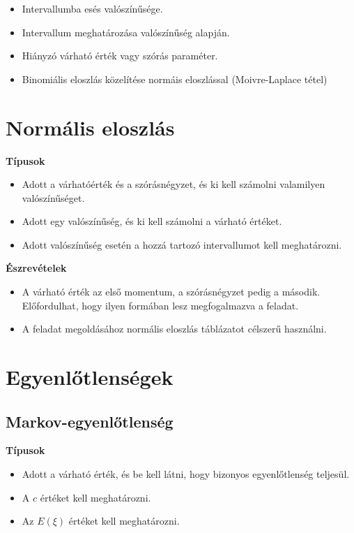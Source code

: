 \documentclass[a4paper]{article}
\begin{document}
\begin{itemize}
\item Intervallumba esés valószínűsége.
\item Intervallum meghatározása valószínűség alapján.
\item Hiányzó várható érték vagy szórás paraméter.
\item Binomiális eloszlás közelítése normáis eloszlással (Moivre-Laplace tétel)
\end{itemize}

\section{Normális eloszlás}

\noindent \textbf{Típusok}

\begin{itemize}
\item Adott a várhatóérték és a szórásnégyzet, és ki kell számolni valamilyen valószínűséget.
\item Adott egy valószínűség, és ki kell számolni a várható értéket.
\item Adott valószínűség esetén a hozzá tartozó intervallumot kell meghatározni.
\end{itemize}

\noindent \textbf{Észrevételek}

\begin{itemize}
\item A várható érték az első momentum, a szórásnégyzet pedig a második. Előfordulhat, hogy ilyen formában lesz megfogalmazva a feladat.
\item A feladat megoldásához normális eloszlás táblázatot célszerű használni.
\end{itemize}

\section{Egyenlőtlenségek}

\subsection{Markov-egyenlőtlenség}

\noindent \textbf{Típusok}

\begin{itemize}
\item Adott a várható érték, és be kell látni, hogy bizonyos egyenlőtlenség teljesül.
\item A $c$ értéket kell meghatározni.
\item Az $E(\xi)$ értéket kell meghatározni.
\end{itemize}
\end{document}
